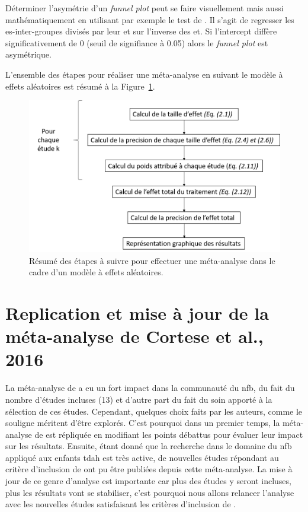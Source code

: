 Déterminer l'asymétrie d'un \textit{funnel plot} peut se faire visuellement mais aussi mathématiquement en utilisant par exemple le test de \citet{Egger1997}. 
Il s'agit de regresser les \gls{es}-inter-groupes divisés par leur \gls{et} sur l'inverse des \gls{et}. Si l'intercept diffère significativement de 
0 (seuil de signifiance à 0.05) alors le \textit{funnel plot} est asymétrique.

L'ensemble des étapes pour réaliser une méta-analyse en suivant le modèle à effets aléatoires est résumé à la Figure~\ref{Figure:pipeline_meta_analyse}.

\begin{figure}[h!]
  \centering
	\includegraphics[width=1.0\linewidth]{figures/chapter-2/pipeline-perform-meta-analysis} 
  \caption{Résumé des étapes à suivre pour effectuer une méta-analyse dans le cadre d'un modèle à effets aléatoires.}
  \label{Figure:pipeline_meta_analyse}
\end{figure}

\section{Replication et mise à jour de la méta-analyse de Cortese et al., 2016} 

La méta-analyse de \citet{Cortese2016} a eu un fort impact dans la communauté du \gls{nfb}, du fait du nombre d'études incluses (13) et d'autre part
du fait du soin apporté à la sélection de ces études. Cependant, quelques choix faits par les auteurs, comme le souligne \citet{Micoulaud2016} méritent d'être explorés.
C'est pourquoi dans un premier temps, la méta-analyse de \citet{Cortese2016} est répliquée en modifiant les points débattus pour évaluer leur impact sur les
résultats. Ensuite, étant donné que la recherche dans le domaine du \gls{nfb} appliqué aux enfants \gls{tdah} est très active, de nouvelles études répondant au 
critère d'inclusion de \citet{Cortese2016} ont pu être publiées depuis cette méta-analyse. La mise à jour de ce genre d'analyse est importante
car plus des études y seront incluses, plus les résultats vont se stabiliser, c'est pourquoi nous allons relancer l'analyse avec les nouvelles études
satisfaisant les critères d'inclusion de \citet{Cortese2016}.

